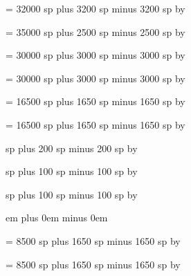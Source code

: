\newskip\interwordspacenotes
\interwordspacenotes = 32000 sp plus 3200 sp minus 3200 sp
\multiply\interwordspacenotes by \factor

\newskip\interwordspacenotestext
\interwordspacenotestext = 35000 sp plus 2500 sp minus 2500 sp
\multiply\interwordspacenotestext by \factor

\newskip\interwordspacetextnotes
\interwordspacetextnotes = 30000 sp plus 3000 sp minus 3000 sp
\multiply\interwordspacetextnotes by \factor

\newskip\interwordspacetext
\interwordspacetext = 30000 sp plus 3000 sp minus 3000 sp
\multiply\interwordspacetext by \factor

\newskip\bispace
\bispace = 16500 sp plus 1650 sp minus 1650 sp
\multiply\bispace by \factor

\newskip\trispace
\trispace = 16500 sp plus 1650 sp minus 1650 sp
\multiply\trispace by \factor

\newskip\punctuminclinatumshift
{} sp plus 200 sp minus 200 sp
\multiply\punctuminclinatumshift by \factor

\newskip\punctuminclinatumanddebilisshift
{} sp plus 100 sp minus 100 sp
\multiply\punctuminclinatumanddebilisshift by \factor

\newskip\punctuminclinatumdebilisshift
{} sp plus 100 sp minus 100 sp
\multiply\punctuminclinatumdebilisshift by \factor

\newskip\afterinitialshift
{} em plus 0em minus 0em

\newskip\spacebeforesmallbar
\spacebeforesmallbar = 8500 sp plus 1650 sp minus 1650 sp
\multiply\spacebeforesmallbar by \factor

\newskip\spaceaftersmallbar
\spaceaftersmallbar = 8500 sp plus 1650 sp minus 1650 sp
\multiply\spaceaftersmallbar by \factor

